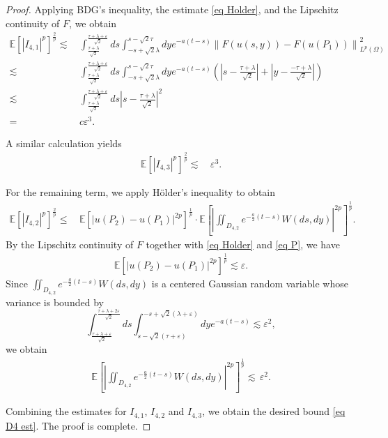 \documentclass[11pt,reqno]{amsart}
\numberwithin{equation}{section}
\newcommand{\1}{{\bf 1}}
\newcommand{\2}{{\bf 2}}
\begin{document}
\begin{proof}
Applying   BDG's  inequality,    the estimate  \eqref{eq Holder},  and the Lipschitz continuity of $F$, we obtain 
\begin{align*}
 \mathbb{E}\left[\left|I_{4, 1}\right|^p\right]^{\frac{2}{p}}
 \lesssim &\,   \int_{\frac{\tau+\lambda}{\sqrt 2} }^ \frac{\tau+\lambda+\varepsilon}{\sqrt 2}ds \int_{-s+ \sqrt{2}\lambda}^{s -\sqrt{2}\tau } dy     
    e^{-a(t-s)} \left\| F(u(s,y)) - F(u(P_1)) \right\|_{L^p(\Omega)} ^2     \\
\lesssim &\,   \int_{\frac{\tau+\lambda}{\sqrt 2} }^ \frac{\tau+\lambda+\varepsilon}{\sqrt 2}ds\int_{-s + \sqrt{2}\lambda}^{s -\sqrt{2}\tau } dy     e^{-a(t-s)}
  \left( \left| s - \frac{\tau+\lambda}{\sqrt{2}} \right| + \left| y - \frac{-\tau+\lambda}{\sqrt{2}} \right| \right) \\
\lesssim &\,    \int_{\frac{\tau+\lambda}{\sqrt 2} }^ \frac{\tau+\lambda+\varepsilon}{\sqrt 2}ds   \left| s - \frac{\tau+\lambda}{\sqrt{2}} \right|^2 \\
= &\,  c \varepsilon^{3}. 
  \end{align*}
  
 
 A similar calculation yields  
\begin{align*}
 \mathbb{E}\left[\left|I_{4, 3}\right|^p\right]^{\frac{2}{p}}\lesssim   &\,    \varepsilon^{3}. 
   \end{align*}
 
   For the remaining term, we apply   H\"older's  inequality to obtain  
\begin{equation}
\begin{split}
 \mathbb E\left[|I_{4, 2}|^p\right]^{\frac{2}{p}} \le  &\,  \mathbb E\left[ \left| u(P_2)- u(P_1)\right|^{2p}\right]^{\frac{1}{p}}  \cdot \mathbb E\left[ \left|\iint_{D_{4, 2}} e^{-\frac{a}{2}(t-s)} W(ds,dy)\right|^{2p}\right]^{\frac1p}.
\end{split}
\end{equation} 
 By the Lipschitz continuity of $F$ together with   \eqref{eq Holder} and  \eqref{eq P}, we have 
 \begin{align*}
 \mathbb E\left[ \left| u(P_2)- u(P_1)\right|^{2p}\right]^{\frac{1}{p}}  \lesssim  \varepsilon.
 \end{align*}
Since $\iint_{D_{4, 2}} e^{-\frac{a}{2}(t-s)} W(ds,dy)$ is a centered  Gaussian random variable whose  variance is bounded by     
$$
   \int_{\frac{\tau+\lambda+\varepsilon}{\sqrt 2}}^{   \frac{\tau+\lambda+2\varepsilon}{\sqrt 2}}ds\int_{
  s-\sqrt{2}(\tau+\varepsilon)}^{  -s+\sqrt 2(\lambda+ \varepsilon)}dy e^{-a(t-s)}     \lesssim  \varepsilon^2,
$$
we obtain
\begin{align*}
\mathbb E\left[ \left|\iint_{D_{4, 2}} e^{-\frac{a}{2}(t-s)} W(ds,dy)\right|^{2p}\right]^{\frac{1}{p}} 
   \lesssim   \,     \varepsilon^2.
 \end{align*}

Combining the estimates for $I_{4,1}$, $I_{4,2}$  and $I_{4,3}$, we obtain the desired bound \eqref{eq D4 est}.   The proof is complete. 
\end{proof}
      
\end{document}
